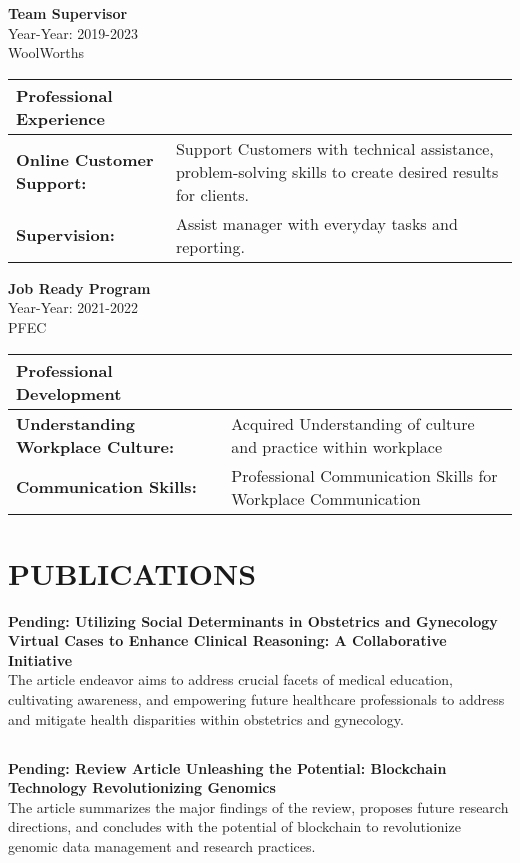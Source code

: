 \documentclass[a4paper,9pt]{article}
\begin{document}
\noindent
\textbf{Team Supervisor} \\
Year-Year: 2019-2023 \\
WoolWorths \\
\begin{tabular}{|p{}|p{}|}
\hline
\textbf{Professional Experience} & \\
\hline
\textbf{Online Customer Support:} & Support Customers with technical assistance, problem-solving skills to create desired results for clients. \\
\hline
\textbf{Supervision:} & Assist manager with everyday tasks and reporting. \\
\hline
\end{tabular}
\vspace{6\baselineskip}

\noindent
\textbf{Job Ready Program} \\
Year-Year: 2021-2022 \\
PFEC \\
\begin{tabular}{|p{}|p{}|}
\hline
\textbf{Professional Development} & \\
\hline
\textbf{Understanding Workplace Culture:} & Acquired Understanding of culture and practice within workplace \\
\hline
\textbf{Communication Skills:} & Professional Communication Skills for Workplace Communication \\
\hline
\end{tabular}



\section*{PUBLICATIONS}

\textbf{Pending: Utilizing Social Determinants in Obstetrics and Gynecology Virtual Cases to Enhance Clinical Reasoning: A Collaborative Initiative} \\
The article endeavor aims to address crucial facets of medical education, cultivating awareness, and empowering future healthcare professionals to address and mitigate health disparities within obstetrics and gynecology.

\subsection*{} 
\textbf{Pending: Review Article Unleashing the Potential: Blockchain Technology Revolutionizing Genomics} \\
The article summarizes the major findings of the review, proposes future research directions, and concludes with the potential of blockchain to revolutionize genomic data management and research practices.
\end{document}
